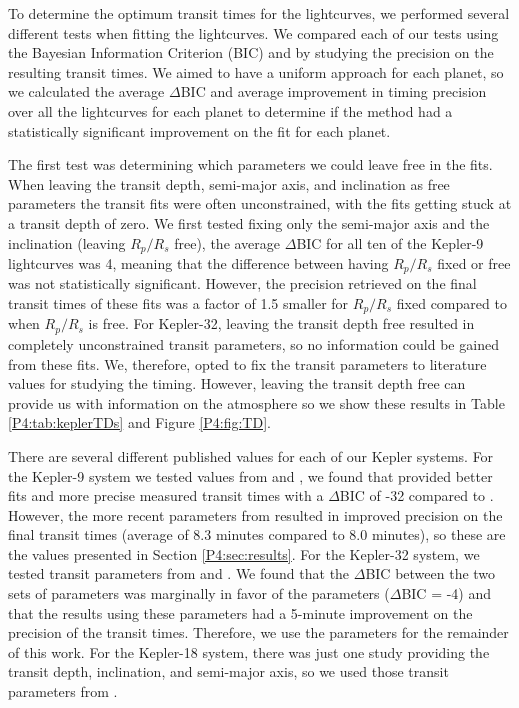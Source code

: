 To determine the optimum transit times for the lightcurves, we performed several different tests when fitting the lightcurves. We compared each of our tests using the Bayesian Information Criterion (BIC) and by studying the precision on the resulting transit times. We aimed to have a uniform approach for each planet, so we calculated the average $\Delta$BIC and average improvement in timing precision over all the lightcurves for each planet to determine if the method had a statistically significant improvement on the fit for each planet.

The first test was determining which parameters we could leave free in the fits. When leaving the transit depth, semi-major axis, and inclination as free parameters the transit fits were often unconstrained, with the fits getting stuck at a transit depth of zero. We first tested fixing only the semi-major axis and the inclination (leaving $R_p/R_s$ free), the average $\Delta$BIC for all ten of the Kepler-9 lightcurves was 4, meaning that the difference between having $R_p/R_s$ fixed or free was not statistically significant. However, the precision retrieved on the final transit times of these fits was a factor of 1.5 smaller for $R_p/R_s$ fixed compared to when $R_p/R_s$ is free. For Kepler-32, leaving the transit depth free resulted in completely unconstrained transit parameters, so no information could be gained from these fits. We, therefore, opted to fix the transit parameters to literature values for studying the timing. However, leaving the transit depth free can provide us with information on the atmosphere so we show these results in Table \ref{P4:tab:keplerTDs} and Figure \ref{P4:fig:TD}.

There are several different published values for each of our Kepler systems. For the Kepler-9 system we tested values from \citet{Holman2010} and \citet{Borsato2019}, we found that \citet{Holman2010} provided better fits and more precise measured transit times with a $\Delta$BIC of -32 compared to \citet{Borsato2019}. However, the more recent parameters from \citet{Borsato2019} resulted in improved precision on the final transit times (average of 8.3 minutes compared to 8.0 minutes), so these are the values presented in Section \ref{P4:sec:results}. For the Kepler-32 system, we tested transit parameters from \citet{Fabrycky2012} and \citet{Muirhead2012}. We found that the $\Delta$BIC between the two sets of parameters was marginally in favor of the \citet{Muirhead2012} parameters ($\Delta$BIC = -4) and that the results using these parameters had a 5-minute improvement on the precision of the transit times. Therefore, we use the \citet{Muirhead2012} parameters for the remainder of this work. For the Kepler-18 system, there was just one study providing the transit depth, inclination, and semi-major axis, so we used those transit parameters from \citet{Cochran2011}.

